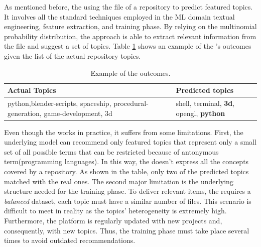 As mentioned before, the \MNB using the \RM file of a repository to predict featured topics. It involves all the standard techniques employed in the ML domain \ie textual engineering, feature extraction, and training phase. By relying on the multinomial probability distribution, the approach is able to extract relevant information from the \RM file and suggest a set of topics. Table \ref{tab:example} shows an example of the \MNB's outcomes given the list of the actual repository topics. 

\begin{table}[h]
\centering

\resizebox{8.5cm}{!} {

\begin{tabular}{| p{3.2cm} | p{3.2cm} | }
\hline
 \textbf{Actual Topics} &\textbf{ Predicted topics} \\ \hline
     python,blender-scripts, spaceship, procedural-generation, game-development, 3d        &  
  shell, terminal, \textbf{3d},	opengl,	\textbf{python}        \\ \hline

\end{tabular}
}
\caption{Example of the \MNB outcomes.}
\label{tab:example}
\end{table} 


Even though the \MNB works in practice, it suffers from some limitations. First, the underlying model can recommend only featured topics that represent only a small set of all possible terms that can be restricted because of antonymous term(\eg programming languages).
In this way, the \MNB doesn't express all the concepts covered by a \GH repository. As shown in the table, only two of the predicted topics matched with the real ones. The second major limitation is the underlying structure needed for the training phase. To deliver relevant items, the \MNB requires a \emph{balanced} dataset, \ie each topic must have a similar number of  \RM files. This scenario is difficult to meet in reality as the topics' heterogeneity is extremely high. Furthermore, the \GH platform is regularly updated with new projects and, consequently, with new topics. Thus, the training phase must take place several times to avoid outdated recommendations. 